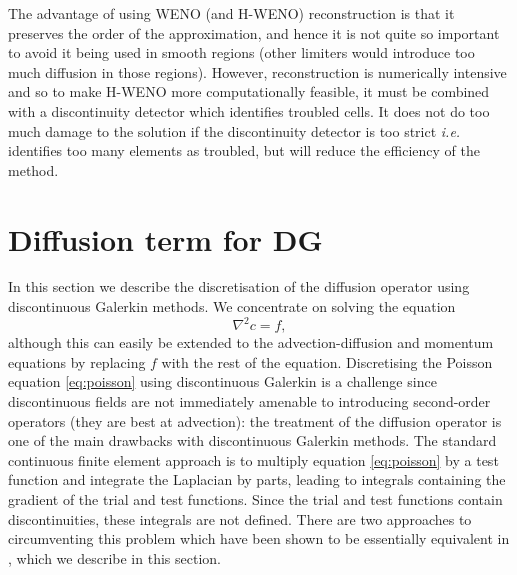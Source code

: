 The advantage of using WENO (and H-WENO) reconstruction is that it
preserves the order of the approximation, and hence it is not quite so
important to avoid it being used in smooth regions (other limiters
would introduce too much diffusion in those regions). However,
reconstruction is numerically intensive and so to make H-WENO more
computationally feasible, it must be combined with a discontinuity
detector which identifies troubled cells. It does not do too much
damage to the solution if the discontinuity detector is too strict
\emph{i.e.}  identifies too many elements as troubled, but will reduce
the efficiency of the method. 

\section{Diffusion term for DG}
\label{sec:NM_DG_diffusion}
 In this section we describe
the discretisation of the diffusion operator using discontinuous
Galerkin methods. We concentrate on solving the equation
\begin{equation}
\label{eq:poisson}
\nabla^2 c = f,
\end{equation}
although this can easily be extended to the advection-diffusion and
momentum equations by replacing $f$ with the rest of the equation.
Discretising the Poisson equation \eqref{eq:poisson} using
discontinuous Galerkin is a challenge since discontinuous fields are
not immediately amenable to introducing second-order operators (they
are best at advection): the treatment of the diffusion operator is one
of the main drawbacks with discontinuous Galerkin methods.  The
standard continuous finite element approach is to multiply equation
\eqref{eq:poisson} by a test function and integrate the Laplacian by
parts, leading to integrals containing the gradient of the trial and
test functions. Since the trial and test functions contain
discontinuities, these integrals are not defined. There are two
approaches to circumventing this problem which have been shown to be
essentially equivalent in \cite{arnold2002}, which we describe in this
section.

